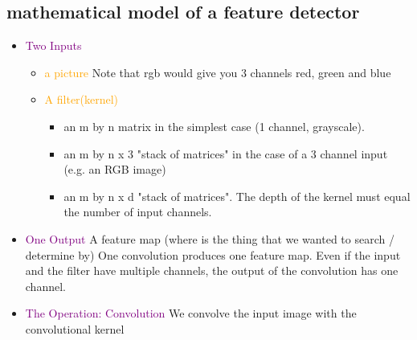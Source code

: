 \documentclass[main.tex,fontsize=8pt,paper=a4,paper=portrait,DIV=calc,]{scrartcl}
\begin{document}
\subsection{mathematical model of a feature detector}
\begin{itemize}
\item \textcolor{purple}{Two Inputs}\newline
  \begin{itemize}
  \item \textcolor{orange}{a picture}\newline
    Note that rgb would give you 3 channels red, green and blue
  \item \textcolor{orange}{A filter(kernel)}\newline
  \begin{itemize}
  \item  an m by n matrix in the simplest case (1 channel, grayscale).
  \item an m by n x 3 "stack of matrices" in the case of a 3 channel input (e.g. an RGB image)
  \item an m by n x d "stack of matrices". The depth of the kernel must equal the number of input channels.
  \end{itemize} 
\end{itemize} 
\item \textcolor{purple}{One Output}\newline
  A feature map (where is the thing that we wanted to search / determine by)\newline
  One convolution produces one feature map. Even if the input and the filter have multiple channels, the output of the convolution has one channel.
\item \textcolor{purple}{The Operation: Convolution}\newline
  We convolve the input image with the convolutional kernel
\end{itemize} 
\end{document}
